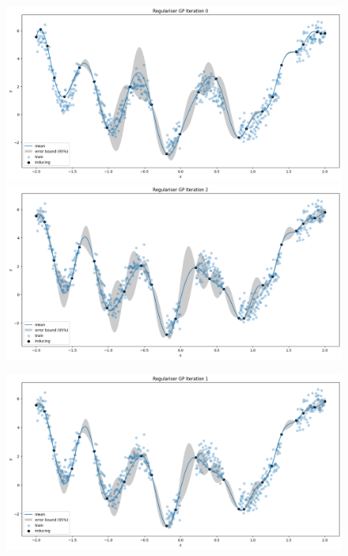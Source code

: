 \documentclass{article}
\numberwithin{equation}{section}
\begin{document}
\begin{figure}[h!]
\centering
\begin{minipage}{.5\textwidth}
  \centering
  \includegraphics[width=\linewidth]{thesis-report/figures/inducing_points_kernel/iteration-0/prediction.png}
  \includegraphics[width=\linewidth]{thesis-report/figures/inducing_points_kernel/iteration-2/prediction.png}
\end{minipage}%
\begin{minipage}{.5\textwidth}
  \centering
  \includegraphics[width=\linewidth]{thesis-report/figures/inducing_points_kernel/iteration-1/prediction.png}

\end{minipage}
\end{figure}
\end{document}
